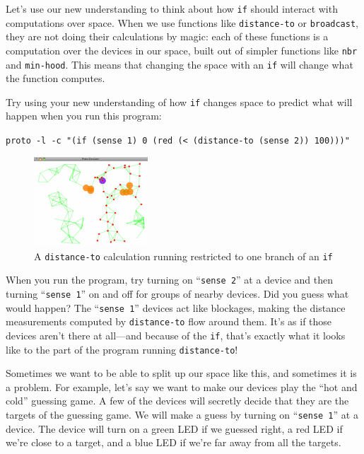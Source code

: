 \documentclass{article}
\newcommand\code[1]{\begin{center}\var{#1}\end{center}}
\newcommand\var[1]{{\tt #1}}
\newcommand\qvar[1]{``{\tt #1}''}
\begin{document}
Let's use our new understanding to think about how \var{if} should
interact with computations over space.  When we use functions like
\var{distance-to} or \var{broadcast}, they are not doing their
calculations by magic: each of these functions is a computation over
the devices in our space, built out of simpler functions like
\var{nbr} and \var{min-hood}.  This means that changing the space with
an \var{if} will change what the function computes.

Try using your new understanding of how \var{if} changes space
to predict what will happen when you run this program:

\code{proto -l -c "(if (sense 1) 0 (red (< (distance-to (sense 2)) 100)))"}

\begin{figure}
  \includegraphics[width=0.38\textwidth]{figures/blocked-distance.png}
  \caption{A \var{distance-to} calculation running restricted to one
    branch of an \var{if}}
  \label{f:blockdist}
\end{figure}

When you run the program, try turning on \qvar{sense 2} at a device
and then turning \qvar{sense 1} on and off for groups of nearby
devices.  Did you guess what would happen?  The \qvar{sense 1} devices
act like blockages, making the distance measurements computed by
\var{distance-to} flow around them.  It's as if those devices aren't
there at all---and because of the \var{if}, that's exactly what
it looks like to the part of the program running \var{distance-to}!

Sometimes we want to be able to split up our space like this, and
sometimes it is a problem.  For example, let's say we want to make our
devices play the ``hot and cold'' guessing game.  A few of the devices
will secretly decide that they are the targets of the guessing game.
We will make a guess by turning on \qvar{sense 1} at a device.  The
device will turn on a green LED if we guessed right, a red LED if
we're close to a target, and a blue LED if we're far away from all the
targets.
\end{document}
